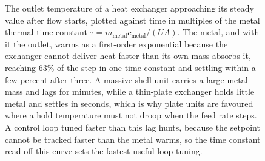 \begin{figure}[htbp]
\centering
{}
\caption[Transient warm-up of an exchanger outlet]{The outlet temperature of a heat
exchanger approaching its steady value after flow starts, plotted against time in
multiples of the metal thermal time constant $\tau = m_{\text{metal}}
c_{\text{metal}}/(UA)$. The metal, and with it the outlet, warms as a first-order
exponential because the exchanger cannot deliver heat faster than its own mass
absorbs it, reaching $63\%$ of the step in one time constant and settling within a
few percent after three. A massive shell unit carries a large metal mass and lags
for minutes, while a thin-plate exchanger holds little metal and settles in seconds,
which is why plate units are favoured where a hold temperature must not droop when
the feed rate steps. A control loop tuned faster than this lag hunts, because the
setpoint cannot be tracked faster than the metal warms, so the time constant read
off this curve sets the fastest useful loop tuning.}
\label{fig:vol04ch06:transient-startup}
\end{figure}
